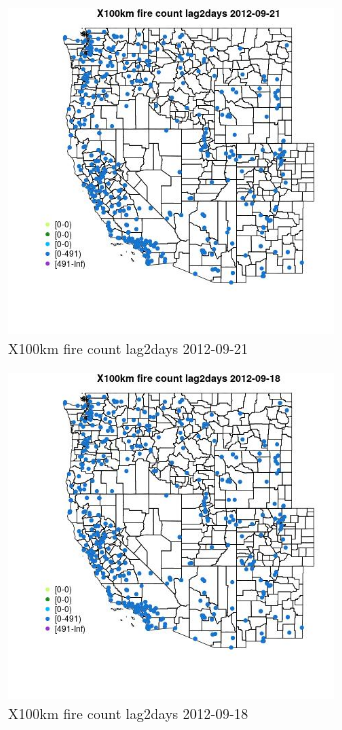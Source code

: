 \begin{figure} 
\centering  
\includegraphics[width=0.77\textwidth]{Code_Outputs/Report_ML_input_PM25_Step4_part_e_de_duplicated_aves_compiled_2019-05-14wNAs_MapObsX100km_fire_count_lag2days2012-09-21.jpg} 
\caption{\label{fig:Report_ML_input_PM25_Step4_part_e_de_duplicated_aves_compiled_2019-05-14wNAsMapObsX100km_fire_count_lag2days2012-09-21}X100km fire count lag2days 2012-09-21} 
\end{figure} 
 

\begin{figure} 
\centering  
\includegraphics[width=0.77\textwidth]{Code_Outputs/Report_ML_input_PM25_Step4_part_e_de_duplicated_aves_compiled_2019-05-14wNAs_MapObsX100km_fire_count_lag2days2012-09-18.jpg} 
\caption{\label{fig:Report_ML_input_PM25_Step4_part_e_de_duplicated_aves_compiled_2019-05-14wNAsMapObsX100km_fire_count_lag2days2012-09-18}X100km fire count lag2days 2012-09-18} 
\end{figure} 
 


